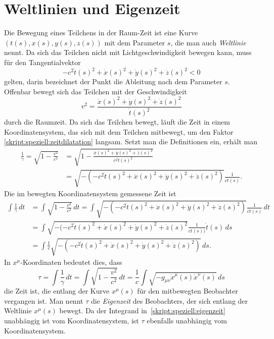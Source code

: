 \section{Weltlinien und Eigenzeit}
Die Bewegung eines Teilchens in der Raum-Zeit ist eine Kurve
$(t(s), x(s), y(s), z(s))$
mit dem Parameter $s$, die man auch {\em Weltlinie} nennt.
%
Da sich das Teilchen nicht mit Lichtgeschwindigkeit bewegen kann, muss
für den Tangentialvektor 
\[
-c^2\dot t(s)^2
+ \dot x(s)^2 + \dot y(s)^2 + \dot z(s)^2
<
0
\]
gelten, darin bezeichnet der Punkt die Ableitung nach dem 
Parameter $s$.
Offenbar bewegt sich das Teilchen mit der Geschwindigkeit
\[
v^2 = \frac{\dot x(s)^2 + \dot y(s)^2 + \dot z(s)^2}{\dot t(s)^2}
\]
durch die Raumzeit.
Da sich das Teilchen bewegt, läuft die Zeit in einem Koordinatensystem,
das sich mit dem Teilchen mitbewegt, um den Faktor
\eqref{skript:speziell:zeitdilatation}
langsam.
Setzt man die Definitionen ein, erhält man
\begin{align*}
\frac{1}{\gamma}
=
\sqrt{1-\frac{v^2}{c^2}}
&=
\sqrt{1- \frac{\dot x(s)^2 + \dot y(s)^2 + \dot z(s)^2}{c^2\dot t(s)^2}}
\\
&=
\sqrt{-(-c^2\dot t(s)^2+\dot x(s)^2 + \dot y(s)^2 + \dot z(s)^2)}\frac{1}{c\dot t(s)}.
\end{align*}
Die im bewegten Koordinatensystem gemessene Zeit ist
\begin{align*}
\int\frac{1}{\gamma}\,dt
&=
\int
\sqrt{1-\frac{v^2}{c^2}}\,dt
=
\int
\sqrt{-(-c^2\dot t(s)^2+\dot x(s)^2 + \dot y(s)^2 + \dot z(s)^2)}\frac{1}{c\dot t(s)}
\,dt
\\
&=
\int
\sqrt{-(-c^2\dot t(s)^2+\dot x(s)^2 + \dot y(s)^2 + \dot z(s)^2}\frac{1}{c\dot t(s))}
\dot t(s)\,ds
\\
&=
\int
\frac1c
\sqrt{-(-c^2\dot t(s)^2+\dot x(s)^2 + \dot y(s)^2 + \dot z(s)^2)}
\,ds.
\end{align*}
In $x^\mu$-Koordinaten bedeutet dies, dass
\begin{equation}
\tau
=
\int
\frac{1}{\gamma}\,dt
=
\int
\sqrt{1-\frac{v^2}{c^2}}\,dt
=
\frac1{c}
\int
\sqrt{-g_{\mu\nu}\dot x^\mu(s) \dot x^\nu(s)}\,ds
\label{skript:speziell:eigenzeit}
\end{equation}
die Zeit ist, die entlang der Kurve $x^\mu(s)$ für den
mitbewegten Beobachter vergangen ist.
Man nennt $\tau$ die {\em Eigenzeit} des
Beobachters, der sich entlang der Weltlinie $x^\mu(s)$ bewegt.
%
Da der Integrand in~\eqref{skript:speziell:eigenzeit} unabhängig ist
vom Koordinatensystem, ist $\tau$ ebenfalls unabhängig vom Koordinatensystem.

